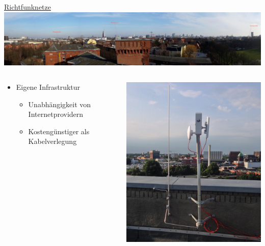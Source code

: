\documentclass[t,aspectratio=169]{beamer}
\begin{document}
  \begin{frame}{\href{https://wiki.freifunk.net/Freifunk_Hamburg/Richtfunknetz}{Richtfunknetze}}
    \vspace{-1em}
    \includegraphics[width=\textwidth]{Bilder/fux}
    \begin{columns}
      \begin{column}{0.6\textwidth}
  \begin{itemize}
    \item Eigene Infrastruktur
    \begin{itemize}
      \item Unabhängigkeit von Internetprovidern
			\item Kostengünstiger als Kabelverlegung
    \end{itemize}
  \end{itemize}
      \end{column}
      \begin{column}{0.4\textwidth}
        \begin{center}
          \vspace{-3.5em}
          \includegraphics[width=.7\textwidth]{Bilder/richtfunkmast2}
        \end{center}
      \end{column}
    \end{columns}
  \end{frame}
	
\end{document}
